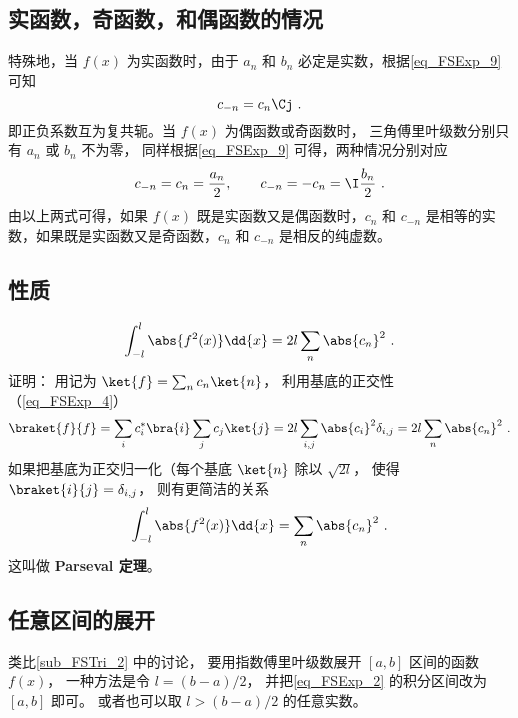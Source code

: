 \subsection{实函数，奇函数，和偶函数的情况}
特殊地，当 $f(x)$ 为实函数时，由于 $a_n$ 和 $b_n$ 必定是实数，根据\autoref{eq_FSExp_9} 可知
\begin{equation}
c_{-n} = c_{n}\Cj~.
\end{equation}
即正负系数互为复共轭。当 $f(x)$ 为偶函数或奇函数时， 三角傅里叶级数分别只有 $a_n$ 或 $b_n$ 不为零， 同样根据\autoref{eq_FSExp_9} 可得，两种情况分别对应
\begin{equation}
c_{-n} = c_n =\frac{a_n}{2}, \qquad
c_{-n} = -c_n = \I \frac{b_n}{2}~.
\end{equation}
由以上两式可得，如果 $f(x)$ 既是实函数又是偶函数时，$c_n$ 和 $c_{-n}$ 是相等的实数，如果既是实函数又是奇函数，$c_n$ 和 $c_{-n}$ 是相反的纯虚数。

\subsection{性质}
\begin{equation}
\int_{-l}^l \abs{f^2(x)} \dd{x} =  2l\sum_n \abs{c_n}^2~.
\end{equation}
证明： 用记为 $\ket{f} = \sum_n c_n \ket{n}$， 利用基底的正交性（\autoref{eq_FSExp_4}）
\begin{equation}
\braket{f}{f} = \sum_i c_i^* \bra{i} \sum_j c_j \ket{j} = 2l \sum_{i,j} \abs{c_i}^2 \delta_{i,j} = 2l \sum_n \abs{c_n}^2~.
\end{equation}
如果把基底为正交归一化（每个基底 $\ket{n}$ 除以 $\sqrt{2l}$， 使得 $\braket{i}{j} = \delta_{i,j}$， 则有更简洁的关系
\begin{equation}\label{eq_FSExp_5}
\int_{-l}^l \abs{f^2(x)} \dd{x} =  \sum_n \abs{c_n}^2~.
\end{equation}
这叫做 \textbf{Parseval 定理}。

\subsection{任意区间的展开}
类比\autoref{sub_FSTri_2} 中的讨论， 要用指数傅里叶级数展开 $[a, b]$ 区间的函数 $f(x)$， 一种方法是令 $l = (b - a)/2$， 并把\autoref{eq_FSExp_2} 的积分区间改为 $[a, b]$ 即可。 或者也可以取 $l > (b - a)/2$ 的任意实数。
